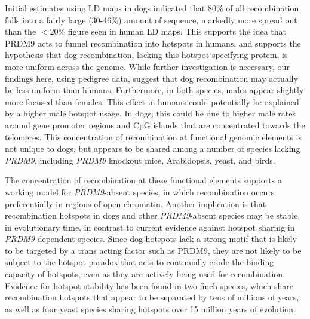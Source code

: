 Initial estimates using LD maps in dogs indicated that 80\% of all recombination falls into a fairly large (30-46\%) amount of sequence\cite{Axelsson2012,Auton2013}, markedly more spread out than the $<$20\% figure seen in human LD maps\cite{hapmap2007}.
This supports the idea that PRDM9 acts to funnel recombination into hotspots in humans, and supports the hypothesis that dog recombination, lacking this hotspot specifying protein, is more uniform across the genome.
While further investigation is necessary,
our findings here, using pedigree data, suggest that dog recombination may actually be less uniform than humans.
Furthermore, in both species, males appear slightly more focused than females.  
This effect in humans could potentially be explained by a higher male hotspot usage\cite{Campbell2015}.
In dogs, this could be due to higher male rates around gene promoter regions and CpG islands that are concentrated towards the telomeres.
This concentration of recombination at functional genomic elements is not unique to dogs, but appears to be shared among a number of species lacking \textit{PRDM9}, including \textit{PRDM9} knockout mice\cite{Brick2012},
Arabidopsis, yeast\cite{Lam2015}, and birds\cite{Singhal2015}.

The concentration of recombination at these functional elements
supports a working model for \textit{PRDM9}-absent species, in which recombination occurs preferentially in regions of open chromatin.
Another implication is that recombination hotspots in dogs and other \textit{PRDM9}-absent species may be stable in evolutionary time, in contrast to current evidence against hotspot sharing in \textit{PRDM9} dependent species.
Since dog hotspots lack a strong motif that is likely to be targeted by a trans acting factor such as PRDM9\cite{Axelsson2012,Auton2013}, they are not likely to be subject to the hotspot paradox that acts to continually erode the binding capacity of hotspots, even as they are actively being used for recombination\cite{Myers2010}.
Evidence for hotspot stability has been found in two finch species, which share recombination hotspots that appear to be separated by tens of millions of years\cite{Singhal2015}, as well as four yeast species sharing hotspots over 15 million years of evolution\cite{Lam2015}.


